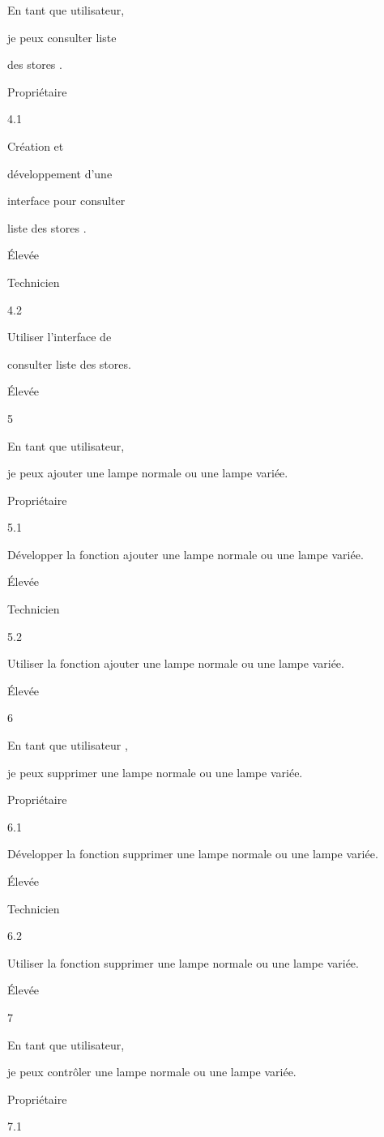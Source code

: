 \documentclass{article}
\begin{document}
En tant que utilisateur,

je peux consulter liste

des stores .

Propriétaire

4.1

Création et

développement d’une

interface pour consulter

liste des stores .

Élevée

Technicien

4.2

Utiliser l’interface de

consulter liste des stores.

Élevée

5

En tant que utilisateur,

je peux ajouter  une lampe normale ou  une lampe variée.

Propriétaire

5.1

Développer la fonction  ajouter  une lampe normale ou  une lampe variée.

Élevée

Technicien

5.2

Utiliser la fonction  ajouter  une lampe normale ou  une lampe variée.

Élevée

6

En tant que utilisateur ,

je peux supprimer  une lampe normale ou  une lampe variée.

Propriétaire

6.1

Développer la fonction supprimer  une lampe normale ou  une lampe variée.  

Élevée

Technicien

6.2

Utiliser la fonction  supprimer  une lampe normale ou  une lampe variée.

Élevée

7

En tant que utilisateur,

je peux contrôler   une lampe normale ou  une lampe variée.

Propriétaire

7.1
\end{document}
